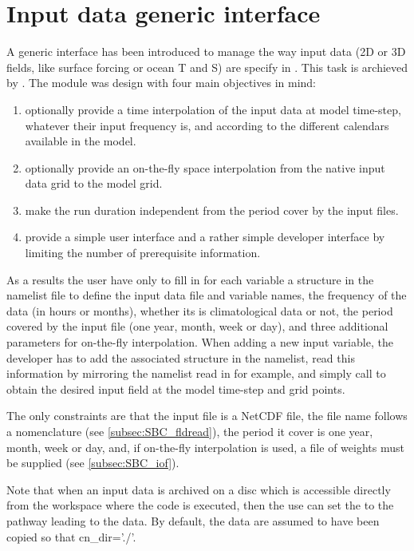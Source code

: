 \documentclass[../tex_main/NEMO_manual]{subfiles}
\begin{document}
\section{Input data generic interface}
\label{sec:SBC_input}

A generic interface has been introduced to manage the way input data
(2D or 3D fields, like surface forcing or ocean T and S) are specify in \NEMO.
This task is archieved by .
The module was design with four main objectives in mind: 
\begin{enumerate}
\item
  optionally provide a time interpolation of the input data at model time-step, whatever their input frequency is,
  and according to the different calendars available in the model.
\item
  optionally provide an on-the-fly space interpolation from the native input data grid to the model grid.
\item
  make the run duration independent from the period cover by the input files.
\item
  provide a simple user interface and a rather simple developer interface by
  limiting the number of prerequisite information. 
\end{enumerate}  

As a results the user have only to fill in for each variable a structure in the namelist file to
define the input data file and variable names, the frequency of the data (in hours or months),
whether its is climatological data or not, the period covered by the input file (one year, month, week or day),
and three additional parameters for on-the-fly interpolation.
When adding a new input variable, the developer has to add the associated structure in the namelist,
read this information by mirroring the namelist read in  for example,
and simply call  to obtain the desired input field at the model time-step and grid points.

The only constraints are that the input file is a NetCDF file, the file name follows a nomenclature 
(see \autoref{subsec:SBC_fldread}), the period it cover is one year, month, week or day, and,
if on-the-fly interpolation is used, a file of weights must be supplied (see \autoref{subsec:SBC_iof}).

Note that when an input data is archived on a disc which is accessible directly from the workspace where
the code is executed, then the use can set the  to the pathway leading to the data.
By default, the data are assumed to have been copied so that cn\_dir='./'.
\end{document}

